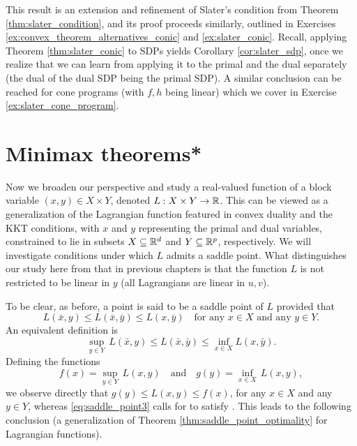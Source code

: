 This result is an extension and refinement of Slater's condition from Theorem 
\ref{thm:slater_condition}, and its proof proceeds similarly, outlined in
Exercises \ref{ex:convex_theorem_alternatives_conic} and \ref{ex:slater_conic}.  
Recall, applying Theorem \ref{thm:slater_conic} to SDPs yields Corollary 
\ref{cor:slater_sdp}, once we realize that we can learn from applying it to the
primal and the dual separately (the dual of the dual SDP being the primal SDP). 
A similar conclusion can be reached for cone programs (with $f,h$ being linear)
which we cover in Exercise \ref{ex:slater_cone_program}.

\section{Minimax theorems*}
\label{sec:minimax_theorems}

Now we broaden our perspective and study a real-valued function of a block
variable $(x,y) \in X \times Y$, denoted $L : X \times Y \to \mathbb{R}$. This can be
viewed as a generalization of the Lagrangian function featured in convex duality 
and the KKT conditions, with $x$ and $y$ representing the primal and dual
variables, constrained to lie in subsets $X \subseteq \mathbb{R}^d$ and $Y \subseteq  
\mathbb{R}^p$, respectively. We will investigate conditions under which $L$ admits a 
saddle point. What distinguishes our study here from that in previous chapters
is that the function $L$ is not restricted to be linear in $y$ (all Lagrangians
are linear in $u,v$).        

To be clear, as before, a point  is
said to be a saddle point of $L$ provided that  
\begin{equation}
\label{eq:saddle_point2}
L(\bar{x}, y) \leq L(\bar{x}, \bar{y}) \leq L(x, \bar{y}) \quad \text{for any
  $x \in X$ and any $y \in Y$}. 
\end{equation}
An equivalent definition is 
\begin{equation}
\label{eq:saddle_point3}
\sup_{y \in Y} \, L(\bar{x}, y) \leq L(\bar{x}, \bar{y}) \leq \inf_{x \in X}
L(x, \bar{y}). 
\end{equation}
Defining the functions
\begin{equation}
\label{eq:saddle_functions}
f(x) = \sup_{y \in Y} \, L(x,y) \quad \text{and} \quad 
g(y) = \inf_{x \in X} \, L(x,y),
\end{equation}
we observe directly that $g(y) \leq L(x,y) \leq f(x)$, for any $x \in X$ and any 
$y \in Y$, whereas \eqref{eq:saddle_point3} calls for  to satisfy . This leads to the following conclusion (a generalization of
Theorem \ref{thm:saddle_point_optimality} for Lagrangian functions). 

